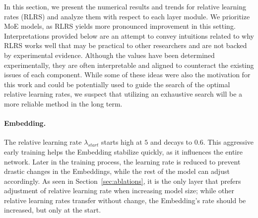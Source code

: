 \documentclass{article}
\theoremstyle{plain}
\theoremstyle{definition}
\theoremstyle{remark}
\newcommand{\jl}[1]{\textcolor{green}{[JL: #1]}}
\begin{document}
    
    
    
    
    
    In this section, we present the numerical results and trends for relative learning rates (RLRS) and analyze them with respect to each layer module. We prioritize MoE models, as RLRS yields more pronounced improvement in this setting.  Interpretations provided below are an attempt to convey intuitions related to why RLRS works well that may be practical to other researchers and are not backed by experimental evidence. Although the values have been determined experimentally, they are often interpretable and aligned to counteract the existing issues of each component. While some of these ideas were also the motivation for this work and could be potentially used to guide the search of the optimal relative learning rates, we suspect that utilizing an exhaustive search will be a more reliable method in the long term.
    
    \paragraph{Embedding.} The relative learning rate $\lambda_{\textit{start}}$ starts high at $5$ and decays to $0.6$. This aggressive early training helps the Embedding stabilize quickly, as it influences the entire network. Later in the training process, the learning rate is reduced to prevent drastic changes in the Embeddings, while the rest of the model can adjust accordingly. As seen in Section~\ref{sec:ablations}, it is the only layer that prefers adjustment of relative learning rate when increasing model size; while other relative learning rates transfer without change, the Embedding's rate should be increased, but only at the start.
    
\end{document}
